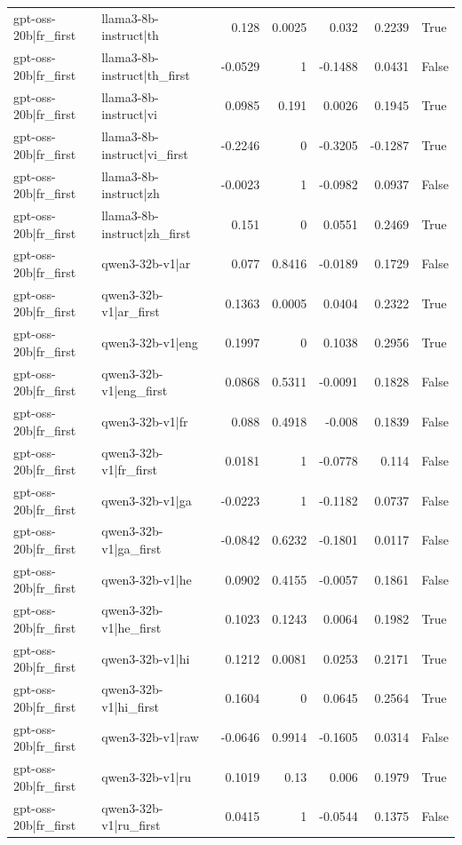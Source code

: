 \begin{table}
\begin{tabular}{l l r r r r l}
gpt-oss-20b|fr_first & llama3-8b-instruct|th & 0.128 & 0.0025 & 0.032 & 0.2239 & True \\
gpt-oss-20b|fr_first & llama3-8b-instruct|th_first & -0.0529 & 1 & -0.1488 & 0.0431 & False \\
gpt-oss-20b|fr_first & llama3-8b-instruct|vi & 0.0985 & 0.191 & 0.0026 & 0.1945 & True \\
gpt-oss-20b|fr_first & llama3-8b-instruct|vi_first & -0.2246 & 0 & -0.3205 & -0.1287 & True \\
gpt-oss-20b|fr_first & llama3-8b-instruct|zh & -0.0023 & 1 & -0.0982 & 0.0937 & False \\
gpt-oss-20b|fr_first & llama3-8b-instruct|zh_first & 0.151 & 0 & 0.0551 & 0.2469 & True \\
gpt-oss-20b|fr_first & qwen3-32b-v1|ar & 0.077 & 0.8416 & -0.0189 & 0.1729 & False \\
gpt-oss-20b|fr_first & qwen3-32b-v1|ar_first & 0.1363 & 0.0005 & 0.0404 & 0.2322 & True \\
gpt-oss-20b|fr_first & qwen3-32b-v1|eng & 0.1997 & 0 & 0.1038 & 0.2956 & True \\
gpt-oss-20b|fr_first & qwen3-32b-v1|eng_first & 0.0868 & 0.5311 & -0.0091 & 0.1828 & False \\
gpt-oss-20b|fr_first & qwen3-32b-v1|fr & 0.088 & 0.4918 & -0.008 & 0.1839 & False \\
gpt-oss-20b|fr_first & qwen3-32b-v1|fr_first & 0.0181 & 1 & -0.0778 & 0.114 & False \\
gpt-oss-20b|fr_first & qwen3-32b-v1|ga & -0.0223 & 1 & -0.1182 & 0.0737 & False \\
gpt-oss-20b|fr_first & qwen3-32b-v1|ga_first & -0.0842 & 0.6232 & -0.1801 & 0.0117 & False \\
gpt-oss-20b|fr_first & qwen3-32b-v1|he & 0.0902 & 0.4155 & -0.0057 & 0.1861 & False \\
gpt-oss-20b|fr_first & qwen3-32b-v1|he_first & 0.1023 & 0.1243 & 0.0064 & 0.1982 & True \\
gpt-oss-20b|fr_first & qwen3-32b-v1|hi & 0.1212 & 0.0081 & 0.0253 & 0.2171 & True \\
gpt-oss-20b|fr_first & qwen3-32b-v1|hi_first & 0.1604 & 0 & 0.0645 & 0.2564 & True \\
gpt-oss-20b|fr_first & qwen3-32b-v1|raw & -0.0646 & 0.9914 & -0.1605 & 0.0314 & False \\
gpt-oss-20b|fr_first & qwen3-32b-v1|ru & 0.1019 & 0.13 & 0.006 & 0.1979 & True \\
gpt-oss-20b|fr_first & qwen3-32b-v1|ru_first & 0.0415 & 1 & -0.0544 & 0.1375 & False \\

\end{tabular}
\end{table}
